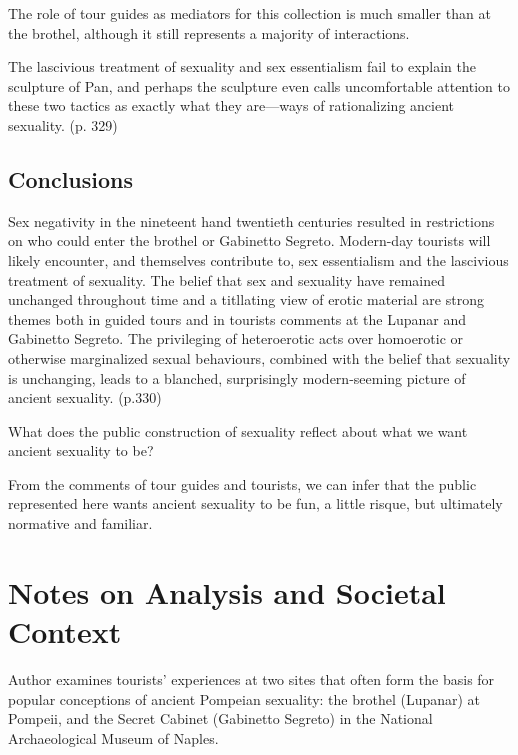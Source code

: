 The role of tour guides as mediators for this collection is much smaller than at the brothel, although it still represents a majority of interactions.

\begin{rmk}
    The lascivious treatment of sexuality and sex essentialism fail to explain the sculpture of Pan, and perhaps the sculpture even calls uncomfortable attention to these two tactics as exactly what they are---ways of rationalizing ancient sexuality. (p. 329)
\end{rmk}

\subsection{Conclusions}

Sex negativity in the nineteent hand twentieth centuries resulted in restrictions on who could enter the brothel or Gabinetto Segreto. Modern-day tourists will likely encounter, and themselves contribute to, sex essentialism and the lascivious treatment of sexuality. The belief that sex and sexuality have remained unchanged throughout time and a titllating view of erotic material are strong themes both in guided tours and in tourists comments at the Lupanar and Gabinetto Segreto. The privileging of heteroerotic acts over homoerotic or otherwise marginalized sexual behaviours, combined with the belief that sexuality is unchanging, leads to a blanched, surprisingly modern-seeming picture of ancient sexuality. (p.330)

\begin{qst}
    What does the public construction of sexuality reflect about what we want ancient sexuality to be?
\end{qst}

From the comments of tour guides and tourists, we can infer that the public represented here wants ancient sexuality to be fun, a little risque, but ultimately normative and familiar.



\section{Notes on Analysis and Societal Context}
\label{sec:SocCont18}


Author examines tourists' experiences at two sites that often form the basis for popular conceptions of ancient Pompeian sexuality: the brothel (Lupanar) at Pompeii, and the Secret Cabinet (Gabinetto Segreto) in the National Archaeological Museum of Naples.

